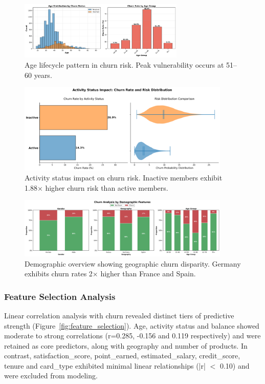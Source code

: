 \documentclass[12pt]{article}
\begin{document}
\begin{figure}[H]
\centering
\includegraphics[width=0.7\textwidth]{../img/03_age_distribution_churn.png}
\caption{Age lifecycle pattern in churn risk. Peak vulnerability occurs at 51–60 years.}
\label{fig:age}
\end{figure}

\begin{figure}[H]
\centering
\includegraphics[width=0.9\textwidth]{../img/08_churn_rate_violin_hybridv2.png}
\caption{Activity status impact on churn risk. Inactive members exhibit 1.88× higher churn risk than active members.}
\label{fig:active}
\end{figure}

\begin{figure}[H]
\centering
\includegraphics[width=0.9\textwidth]{../img/02_demographic_overview.png}
\caption{Demographic overview showing geographic churn disparity. Germany exhibits churn rates 2× higher than France and Spain.}
\label{fig:geography}
\end{figure}

\subsubsection{Feature Selection Analysis}
Linear correlation analysis with churn revealed distinct tiers of predictive strength (Figure~\ref{fig:feature_selection}). Age, activity status and balance showed moderate to strong correlations (r=0.285, -0.156 and 0.119 respectively) and were retained as core predictors, along with geography and number of products. In contrast, satisfaction\_score, point\_earned, estimated\_salary, credit\_score, tenure and card\_type exhibited minimal linear relationships (|r| $<$ 0.10) and were excluded from modeling.
\end{document}
